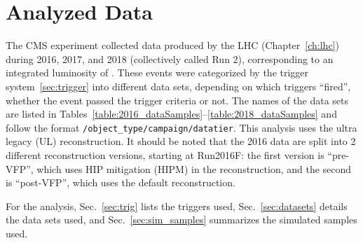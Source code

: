 \section{Analyzed Data}
\label{sec:analyzed_data}
The CMS experiment collected data produced by the LHC (Chapter~\ref{ch:lhc}) during 2016, 2017, and 2018 (collectively called Run 2), corresponding to an integrated luminosity of \lumiruntwo.
These events were categorized by the trigger system~\ref{sec:trigger} into different data sets, depending on which triggers ``fired'', \ie whether the event passed the trigger criteria or not.
The names of the data sets are listed in Tables~\ref{table:2016_dataSamples}--\ref{table:2018_dataSamples} and follow the format \texttt{/object\_type/campaign/datatier}.
This analysis uses the ultra legacy (UL) reconstruction. %
It should be noted that the 2016 data are split into 2 different reconstruction versions, starting at Run2016F:
the first version is ``pre-VFP'', which uses HIP mitigation (HIPM) in the reconstruction, and the second is ``post-VFP'', which uses the default reconstruction.

For the \hzzfourl analysis, Sec.~\ref{sec:trig} lists the triggers used, Sec.~\ref{sec:datasets} details the data sets used, and Sec.~\ref{sec:sim_samples} summarizes the simulated samples used.

